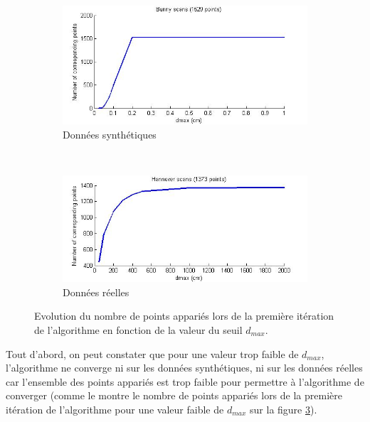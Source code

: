 \begin{figure}[!h]
   \centering
   \begin{subfigure}[t]{.5\linewidth}
     \centering
     \includegraphics[scale=0.4]{Images/Resultats/bunny_size_subset_dmax.jpg}
     \caption{Données synthétiques}
     \label{fig:subset_dmax_synthe}
   \end{subfigure}%
   ~
   \begin{subfigure}[t]{.5\linewidth}
     \centering
     \includegraphics[scale=0.4]{Images/Resultats/hannover_size_subset_dmax.jpg}
     \caption{Données réelles}
     \label{fig:subset_dmax_reelle}
   \end{subfigure}
   
   \caption{Evolution du nombre de points appariés lors de la première itération de l'algorithme en fonction de la valeur du seuil $d_{max}$.}
   \label{fig:subset_dmax}
\end{figure}

Tout d'abord, on peut constater que pour une valeur trop faible de $d_{max}$, l'algorithme ne converge ni sur les données synthétiques, ni sur les données réelles car l'ensemble des points appariés est trop faible pour permettre à l'algorithme de converger (comme le montre le nombre de points appariés lors de la première itération de l'algorithme pour une valeur faible de $d_{max}$ sur la figure \ref{fig:subset_dmax}).\\


